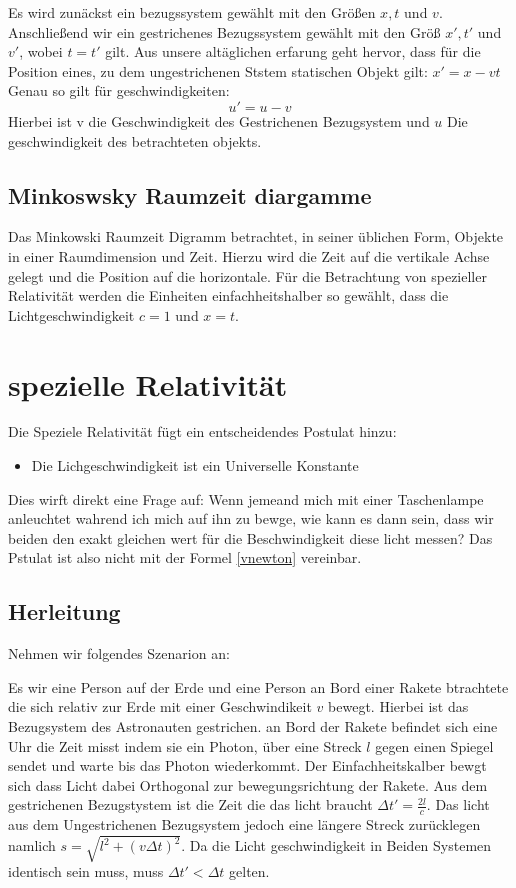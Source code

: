 \documentclass[12pt]{article}
\begin{document}
Es wird zunäckst ein bezugssystem gewählt mit den Größen $x, t$ und $v$.
Anschließend wir ein gestrichenes Bezugssystem gewählt mit den Größ $x', t'$ und $v'$, wobei $t = t'$ gilt.
Aus unsere altäglichen erfarung geht hervor, dass für die Position eines, zu dem ungestrichenen Ststem statischen Objekt gilt: $x' = x-vt$
Genau so gilt für geschwindigkeiten:
\begin{equation}
\label{vnewton}
u' =u - v
\end{equation}
Hierbei ist v die Geschwindigkeit des Gestrichenen Bezugsystem und $u$ Die geschwindigkeit des betrachteten objekts.
\subsection{Minkoswsky Raumzeit diargamme}
Das Minkowski Raumzeit Digramm betrachtet, in seiner üblichen Form, Objekte in einer Raumdimension und Zeit.
Hierzu wird die Zeit auf die vertikale Achse gelegt und die Position auf die horizontale.
Für die Betrachtung von spezieller Relativität werden die Einheiten einfachheitshalber so gewählt, dass die Lichtgeschwindigkeit $c = 1$ und $x = t$.
\section{spezielle Relativität}
Die Speziele Relativität fügt ein entscheidendes Postulat hinzu:
\begin{itemize}
\item Die Lichgeschwindigkeit ist ein Universelle Konstante
\end{itemize}
Dies wirft direkt eine Frage auf:
Wenn jemeand mich mit einer Taschenlampe anleuchtet wahrend ich mich auf ihn zu bewge, wie kann es dann sein, dass wir beiden den exakt gleichen wert für die Beschwindigkeit diese licht messen?
Das Pstulat ist also nicht mit der Formel \ref{vnewton} vereinbar.
\subsection{Herleitung}
Nehmen wir folgendes Szenarion an:

Es wir eine Person auf der Erde und eine Person an Bord einer Rakete btrachtete die sich relativ zur Erde mit einer Geschwindikeit $v$ bewegt.
Hierbei ist das Bezugsystem des Astronauten gestrichen.
an Bord der Rakete befindet sich eine Uhr die Zeit misst indem sie ein Photon, über eine Streck $l$ gegen einen Spiegel sendet und warte bis das Photon wiederkommt.
Der Einfachheitskalber bewgt sich dass Licht dabei Orthogonal zur bewegungsrichtung der Rakete.
Aus dem gestrichenen Bezugstystem ist die Zeit die das licht braucht $\Delta t' = \frac{2l}{c}$.
Das licht aus dem Ungestrichenen Bezugsystem jedoch eine längere Streck zurücklegen namlich $s = \sqrt{l^2 + (v \Delta t)^2}$.
Da die Licht geschwindigkeit in Beiden Systemen identisch sein muss, muss $\Delta t' < \Delta t$ gelten.
\end{document}
